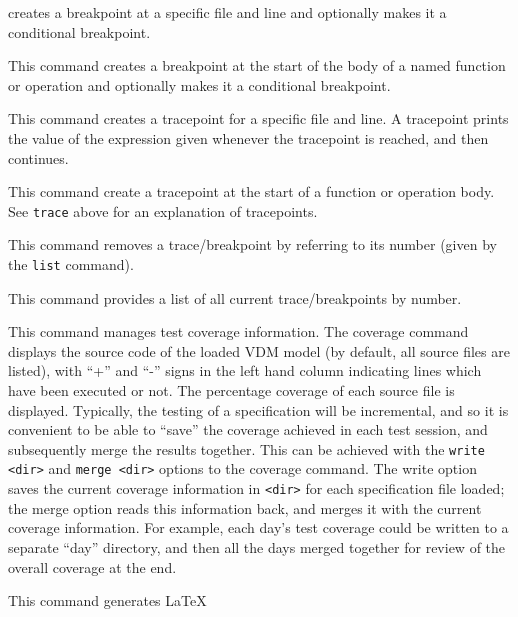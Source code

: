 \documentclass{overturerepchap}
\begin{document}
\begin{description}
  creates a breakpoint at a specific file and line and optionally makes
  it a conditional breakpoint.  
\item[\texttt{break <function/operation> [<condition>]}:] This command
  creates a breakpoint at the start of the body of a named function or operation and
  optionally makes it a conditional breakpoint. 
\item[\texttt{trace [<file>:]<line\#> [<exp>]}:] This command creates a
  tracepoint for a specific file and line. A tracepoint prints the value of the
  expression given whenever the tracepoint is reached, and then continues.
\item[\texttt{trace <function/operation> [<exp>]}:] This command
  create a tracepoint at the start of a function or operation body.
  See \texttt{trace} above for an explanation of tracepoints.
\item[\texttt{remove <breakpoint\#>}:] This command removes a
  trace/breakpoint by referring to its number (given by the
  \texttt{list} command). 
\item[\texttt{list}:] This command provides a list of all current
  trace/breakpoints by number.  
\item[\texttt{coverage [clear|write <dir>|merge <dir>|<filenames>]}:]
  This command manages test coverage information.
  The coverage command displays the source
  code of the loaded VDM model (by default, all source files are
  listed), with ``+'' and ``-'' signs in the left hand column
  indicating lines which have been executed or not. The percentage
  coverage of each source file
  is displayed. Typically, the
  testing of a specification will be incremental, and so it is
  convenient to be able to ``save'' the coverage achieved in each test
  session, and subsequently merge the results together. This can be
  achieved with the \texttt{write <dir>} and \texttt{merge <dir>} options to the
  coverage command. The write option saves the current coverage
  information in \texttt{<dir>} for each specification file loaded; the merge
  option reads this information back, and merges it with the current
  coverage information. For example, each day's test coverage could be
  written to a separate ``day'' directory, and then all the days merged
  together for review of the overall coverage at the end.
\item[\texttt{latex|latexdoc [<files>]}:] This command generates \LaTeX\

\end{description}
\end{document}
